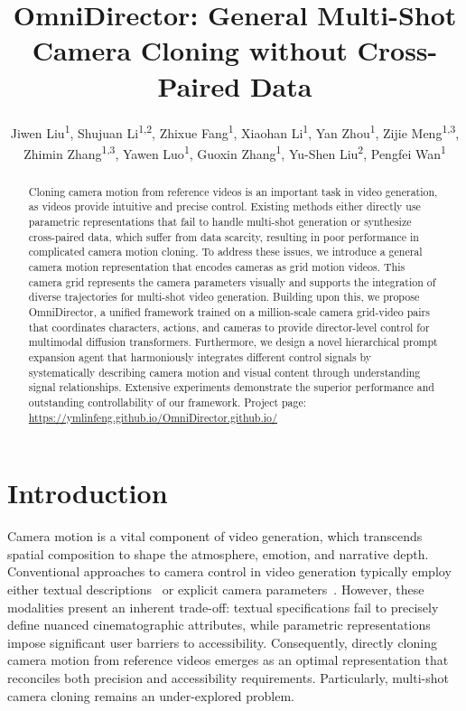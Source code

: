 \documentclass[letterpaper]{article} %
\title{OmniDirector: General Multi-Shot Camera Cloning without Cross-Paired Data}
\author{
    Jiwen Liu\textsuperscript{\rm 1}\equalcontrib, Shujuan Li\textsuperscript{\rm 1,\rm 2}\equalcontrib, Zhixue Fang\textsuperscript{\rm 1}, Xiaohan Li\textsuperscript{\rm 1}, Yan Zhou\textsuperscript{\rm 1}\corresponding, Zijie Meng\textsuperscript{\rm 1,\rm 3}, \\ Zhimin Zhang\textsuperscript{\rm 1,\rm 3}, Yawen Luo\textsuperscript{\rm 1}, Guoxin Zhang\textsuperscript{\rm 1}, Yu-Shen Liu\textsuperscript{\rm 2}, Pengfei Wan\textsuperscript{\rm 1}
}
\begin{document}
\maketitle
\begin{abstract}
\vspace{-0.3cm}
Cloning camera motion from reference videos is an important task in video generation, as videos provide intuitive and precise control. Existing methods either directly use parametric representations that fail to handle multi-shot generation or synthesize cross-paired data, which suffer from data scarcity, resulting in poor performance in complicated camera motion cloning.
To address these issues, we introduce a general camera motion representation that encodes cameras as grid motion videos. This camera grid represents the camera parameters visually and supports the integration of diverse trajectories for multi-shot video generation.
Building upon this, we propose OmniDirector, a unified framework trained on a million-scale camera grid-video pairs that coordinates characters, actions, and cameras to provide director-level control for multimodal diffusion transformers. 
Furthermore, we design a novel hierarchical prompt expansion agent that harmoniously integrates different control signals by systematically describing camera motion and visual content through understanding signal relationships. Extensive experiments demonstrate the superior performance and outstanding controllability of our framework. Project page:  \textcolor{blue}{{\url{https://ymlinfeng.github.io/OmniDirector.github.io/}}}%


\end{abstract}

\section{Introduction}
Camera motion is a vital component of video generation, which transcends spatial composition to shape the atmosphere, emotion, and narrative depth.
Conventional approaches to camera control in video generation typically employ either textual descriptions~\cite{wang2026multishotmaster,luo2026shotstream} or explicit camera parameters~\cite{he2024cameractrl, bai2025recammaster,wang2025cinemaster,meng2026make}. However, these modalities present an inherent trade-off: textual specifications fail to precisely define nuanced cinematographic attributes, while parametric representations impose significant user barriers to accessibility. Consequently, directly cloning camera motion from reference videos emerges as an optimal representation that reconciles both precision and accessibility requirements. Particularly, multi-shot camera cloning remains an under-explored problem.
\end{document}
